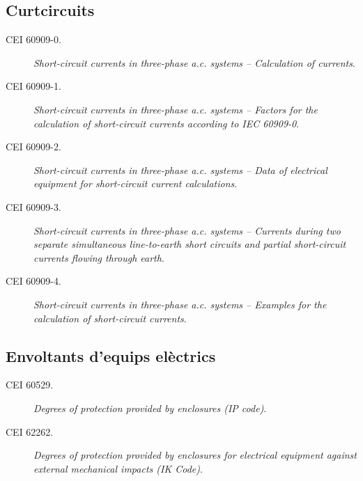 \subsection*{Curtcircuits}
\begin{description}
    \item [\hspace{5mm}CEI 60909-0.] \textit{Short-circuit currents in three-phase a.c. systems -- Calculation of currents}.
    \item [\hspace{5mm}CEI 60909-1.] \textit{Short-circuit currents in three-phase a.c. systems --  Factors for the calculation of short-circuit currents according to IEC 60909-0}.
    \item [\hspace{5mm}CEI 60909-2.] \textit{Short-circuit currents in three-phase a.c. systems --  Data of electrical equipment for short-circuit current calculations}.
    \item [\hspace{5mm}CEI 60909-3.] \textit{Short-circuit currents in three-phase a.c. systems -- Currents during two separate simultaneous line-to-earth short circuits and partial short-circuit currents flowing through earth}.
    \item [\hspace{5mm}CEI 60909-4.] \textit{Short-circuit currents in three-phase a.c. systems -- Examples for the calculation of short-circuit currents}.
\end{description}

\subsection*{Envoltants d'equips elèctrics}
\begin{description}
	\item [\hspace{5mm}CEI 60529.] \textit{Degrees of protection provided by enclosures (IP code)}.
	\item [\hspace{5mm}CEI 62262.] \textit{Degrees of protection provided by enclosures for electrical equipment against external mechanical impacts (IK Code)}.
\end{description}

